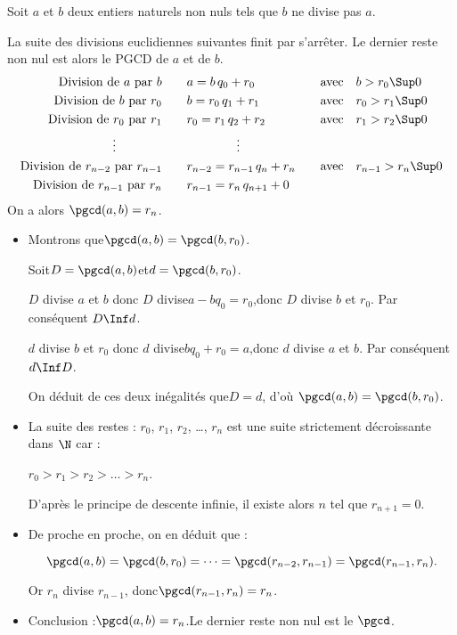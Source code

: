 \begin{theoreme}
  Soit $a$ et $b$ deux entiers naturels non nuls tels que $b$ ne
  divise pas $a$.

  La suite des divisions euclidiennes suivantes finit par
  s'arrêter. Le dernier reste non nul est alors le PGCD de $a$ et de
  $b$.\vspace{-5pt}
$$\begin{aligned}
\text{Division de $a$ par $b$}\qquad &a=b\,q_0+r_0 \quad&\text{avec}&\quad b>r_0\Sup0\\
\text{Division de $b$ par $r_0$}\qquad &b=r_0\,q_1+r_1 \quad&\text{avec}&\quad r_0>r_1\Sup0\\
\text{Division de $r_0$ par $r_1$}\qquad &r_0=r_1\,q_2+r_2 \quad&\text{avec}&\quad r_1>r_2\Sup0\\
\vdots \hspace{2cm}\null & \qquad\qquad\vdots\\
\text{Division de $r_{n-2}$ par $r_{n-1}$}\qquad &r_{n-2}=r_{n-1}\,q_n+r_n \quad&\text{avec}&\quad r_{n-1}>r_n\Sup0\\
\text{Division de $r_{n-1}$ par $r_n$}\qquad &r_{n-1}=r_n\,q_{n+1}+0 & \\
\end{aligned}$$
On a alors \enskip$\pgcd(a,b)=r_n$.

\end{theoreme}

\begin{preuve}
\begin{itemize}
\item Montrons que\enskip $\pgcd(a,b)=\pgcd(b,r_0)$.\medskip

Soit\enskip $D=\pgcd(a,b)$\enskip et\enskip $d=\pgcd(b,r_0)$.\medskip

$D$ divise $a$ et $b$ donc $D$ divise\enskip $a-bq_0=r_0$,\enskip donc $D$ divise $b$ et $r_0$. Par conséquent $D\Inf d$.

$d$ divise $b$ et $r_0$ donc $d$ divise\enskip $bq_0+r_0=a$,\enskip donc $d$ divise $a$ et $b$. Par conséquent $d\Inf D$.\medskip

On  déduit de ces deux inégalités que\enskip $D=d$, d'où $\pgcd(a,b)=\pgcd(b,r_0)$.\medskip

\item La suite des restes : $r_0$, $r_1$, $r_2$, \dots, $r_n$ est une suite strictement décroissante dans $\N$ car :

$r_0>r_1>r_2> \dots >r_n$. 

D'après le principe de descente infinie, il existe alors $n$ tel que $r_{n+1}=0$.\medskip

\item De proche en proche, on en déduit que : \vspace{-5pt}

$$\pgcd(a,b)=\pgcd(b,r_0)=\dots=\pgcd(r_{n-2},r_{n-1})=\pgcd(r_{n-1},r_n).$$ 

Or $r_n$ divise $r_{n-1}$, donc\enskip $\pgcd(r_{n-1},r_n)=r_n$.\medskip

\item Conclusion :\enskip $\pgcd(a,b)=r_n$.\enskip Le dernier reste non nul est le $\pgcd$.
\end{itemize}
\end{preuve}

